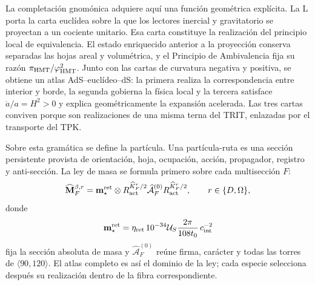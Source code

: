 La completación gnomónica adquiere aquí una función geométrica explícita. La
L porta la carta euclídea sobre la que los lectores inercial y gravitatorio
se proyectan a un cociente unitario. Esa carta constituye la realización del
principio local de equivalencia. El estado enriquecido anterior a la
proyección conserva separadas las hojas areal y volumétrica, y el Principio
de Ambivalencia fija su razón
\(\pi_{\rm HMT}/\varphi_{\rm HMT}^{2}\). Junto con las cartas de curvatura
negativa y positiva, se obtiene un atlas AdS--euclídeo--dS: la primera
realiza la correspondencia entre interior y borde, la segunda gobierna la
física local y la tercera satisface \(\ddot a/a=H^2>0\) y explica
geométricamente la expansión acelerada. Las tres cartas conviven porque son
realizaciones de una misma terna del TRIT, enlazadas por el transporte del
TPK.

Sobre esta gramática se define la partícula. Una partícula-ruta es una sección
persistente provista de orientación, hoja, ocupación, acción, propagador,
registro y anti-sección. La ley de masa se formula primero sobre cada
multisección \(F\):
\[
 \widehat{\mathbf M}^{\beta,r}_F
 =\mathbf m_\star^{\rm ret}\otimes
  R_{\rm act}^{\widehat K_F^r/2}
  \widehat{\mathcal A}^{(0)}_F
  R_{\rm act}^{\widehat K_F^r/2},
 \qquad r\in\{D,\Omega\},
\]
donde
\[
 \mathbf m_\star^{\rm ret}
 =\eta_{\rm ret}\,10^{-34}\mathcal U_S
   \frac{2\pi}{108t_0}\,c_{\rm int}^{-2}
\]
fija la sección absoluta de masa y
\(\widehat{\mathcal A}^{(0)}_F\) reúne firma, carácter y todas las torres de
\(\langle90,120\rangle\). El atlas completo es así el dominio de la ley; cada
especie selecciona después su realización dentro de la fibra correspondiente.

